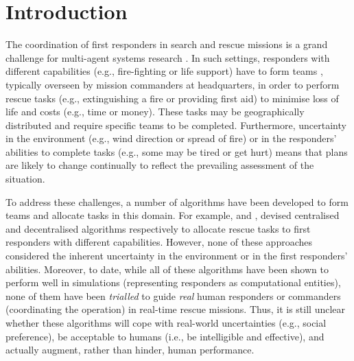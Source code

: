 \section{Introduction}
\noindent The coordination of first responders in search and rescue missions is a grand challenge for multi-agent systems research \cite{kitano:2001}. In such settings, responders with different capabilities (e.g., fire-fighting or life support) have to form teams , typically overseen by mission commanders at headquarters, in order to perform rescue tasks  (e.g., extinguishing a fire or providing first aid) to minimise  loss of life and costs (e.g., time or money). These tasks may be geographically distributed  and require specific teams  to be completed. Furthermore, uncertainty in the environment (e.g., wind direction or spread of fire) or in the responders' abilities to complete tasks (e.g., some may be tired or get hurt) means that plans are likely to change continually to reflect the prevailing assessment of the situation. 

To address these challenges, a number of algorithms  have been developed to form teams and allocate tasks in this domain. For example, \cite{ramchurn:etal:2010,Scerri2005} and \cite{Chapman2009}, devised centralised and decentralised algorithms respectively to allocate rescue tasks to first responders with different capabilities. However, none of these approaches considered the inherent uncertainty in the environment or in the first responders' abilities. Moreover, to date, while all of these algorithms have been shown to perform well in simulations (representing responders as computational entities), none of them have been \emph{trialled} to guide \emph{real} human responders or commanders (coordinating the operation) in real-time rescue missions. Thus, it is still unclear whether these algorithms will cope with real-world uncertainties (e.g., social preference), be acceptable to humans (i.e., be intelligible and effective), and actually augment, rather than hinder,  human performance.

